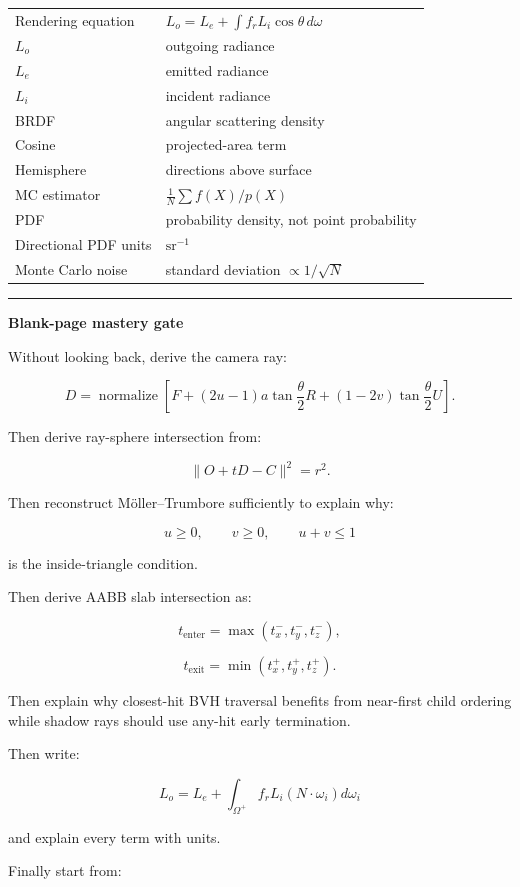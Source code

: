 {\begin{longtable}[]{@{}ll@{}}
Rendering equation & \(L_o=L_e+\int f_rL_i\cos\theta\,d\omega\) \\
\(L_o\) & outgoing radiance \\
\(L_e\) & emitted radiance \\
\(L_i\) & incident radiance \\
BRDF & angular scattering density \\
Cosine & projected-area term \\
Hemisphere & directions above surface \\
MC estimator & \(\frac1N\sum f(X)/p(X)\) \\
PDF & probability density, not point probability \\
Directional PDF units & \(\mathrm{sr}^{-1}\) \\
Monte Carlo noise & standard deviation \(\propto1/\sqrt N\) \\
\end{longtable}
}

\begin{center}\rule{0.5\linewidth}{0.5pt}\end{center}

\textbf{Blank-page mastery gate}

Without looking back, derive the camera ray:

\[
D=
\operatorname{normalize}
\left[
F+
(2u-1)a\tan\frac{\theta}{2}R
+
(1-2v)\tan\frac{\theta}{2}U
\right].
\]

Then derive ray-sphere intersection from:

\[
\|O+tD-C\|^2=r^2.
\]

Then reconstruct Möller--Trumbore sufficiently to explain why:

\[
u\ge0,\qquad
v\ge0,\qquad
u+v\le1
\]

is the inside-triangle condition.

Then derive AABB slab intersection as:

\[
t_{\text{enter}}
=
\max(t_x^-,t_y^-,t_z^-),
\]

\[
t_{\text{exit}}
=
\min(t_x^+,t_y^+,t_z^+).
\]

Then explain why closest-hit BVH traversal benefits from near-first child ordering while shadow rays should use any-hit early termination.

Then write:

\[
L_o=
L_e+
\int_{\Omega^+}
f_rL_i(N\cdot\omega_i)d\omega_i
\]

and explain every term with units.

Finally start from:

